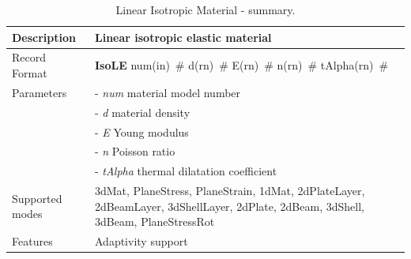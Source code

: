 \documentclass[epsf,a4paper]{article}
\newcommand{\descitem}[1]{{\noindent \bf #1}}
\newcommand{\elemparam}[2]{{{#1\tiny (#2)}~\#}}
\newcommand{\param}[1]{{\it #1}}
\begin{document}
\begin{table}[h]                                                                
\begin{tabular}{|l|p{9cm}|}                                                      
\hline                                                                          
Description & Linear isotropic elastic material\\
\hline                                                                          
Record Format & \descitem{IsoLE} \elemparam{num}{in}
\elemparam{d}{rn} \elemparam{E}{rn} \elemparam{n}{rn}
\elemparam{tAlpha}{rn}\\
Parameters &- \param{num} material model number\\
&- \param{d} material density\\
&- \param{E} Young modulus\\
&- \param{n} Poisson ratio\\
&- \param{tAlpha} thermal dilatation coefficient\\
Supported modes& 3dMat, PlaneStress, PlaneStrain, 1dMat,
2dPlateLayer, 2dBeamLayer, 3dShellLayer, 2dPlate, 2dBeam, 3dShell,
3dBeam, PlaneStressRot\\
Features & Adaptivity support\\
\hline
\end{tabular}                                                                   
\caption{Linear Isotropic Material - summary.}                
\label{IsoLE_table}                                                         
\end{table}                                                                     
\end{document}
